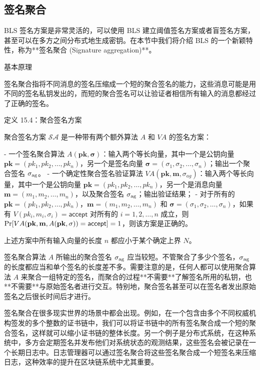 \subsection{签名聚合}\label{subsec:15-5-2}

BLS 签名方案是非常灵活的，可以使用 BLS 建立阈值签名方案或者盲签名方案，甚至可以在多方之间分布式地生成密钥。在本节中我们将介绍 BLS 的一个新颖特性，称为**签名聚合 (Signature aggregation)**。

基本原理

签名聚合指将不同消息的签名压缩成一个短的聚合签名的能力，这些消息可能是用不同的签名私钥发出的，而短的聚合签名可以让验证者相信所有输入的消息都经过了正确的签名。

定义 15.4：聚合签名方案

聚合签名方案 $\mathcal{SA}$ 是一种带有两个额外算法 $A$ 和 $VA$ 的签名方案：

- 一个签名聚合算法 $A(\mathbf{pk},\mathbf{\sigma})$：输入两个等长向量，其中一个是公钥向量 $\mathbf{pk}=(pk_1,pk_2,\dots, pk_n)$，另一个是签名向量 $\mathbf{\sigma}=(\sigma_1, \sigma_2, \dots, \sigma_n)$；输出一个聚合签名 $\sigma_{\rm ag}$。
- 一个确定性聚合签名验证算法 $VA(\mathbf{pk},\mathbf{m},\sigma_{ag})$：输入两个等长向量，其中一个是公钥向量 $\mathbf{pk}=(pk_1,pk_2,\dots, pk_n)$，另一个是消息向量 $\mathbf{m}=(m_1, m_2, \dots, m_n)$，以及聚合签名 $\sigma_{\rm ag}$；输出验证结果；
- 对于所有的 $\mathbf{pk}=(pk_1,pk_2,\dots, pk_n)$，$\mathbf{m}=(m_1, m_2, \dots, m_n)$ 和 $\mathbf{\sigma}=(\sigma_1, \sigma_2, \dots, \sigma_n)$，如果有 $V(pk_i,m_i,\sigma_i)=\mathsf{accept}$ 对所有的 $i=1,2,\dots,n$ 成立，则 ${\rm Pr}[VA(\mathbf{pk},\mathbf{m},A(\mathbf{pk},\mathbf{\sigma}))=\mathsf{accept}]=1$，则该方案是正确的。

上述方案中所有输入向量的长度 $n$ 都应小于某个确定上界 $N$。

签名聚合算法 $A$ 所输出的聚合签名 $\sigma_{\rm ag}$ 应当较短。不管聚合了多少个签名，$\sigma_{\rm ag}$ 的长度都应当和单个签名的长度差不多。需要注意的是，任何人都可以使用聚合算法 $A$ 来聚合一组特定的签名，而聚合的过程**不需要**了解签名所用的私钥，也**不需要**与原始签名者进行交互。特别地，聚合签名甚至可以在签名者发出原始签名之后很长时间后才进行。

签名聚合在很多现实世界的场景中都会出现。例如，在一个包含由多个不同权威机构签发的多个整数的证书链中，我们可以将证书链中的所有签名聚合成一个短的聚合签名，这样就可以缩小证书链的整体长度。另一个例子是分布式系统，在这种系统中，多方会定期签名并发布他们对系统状态的观测结果，这些签名会被记录在一个长期日志中。日志管理器可以通过签名聚合将这些签名聚合成一个短签名来压缩日志，这种效率的提升在区块链系统中尤其重要。

